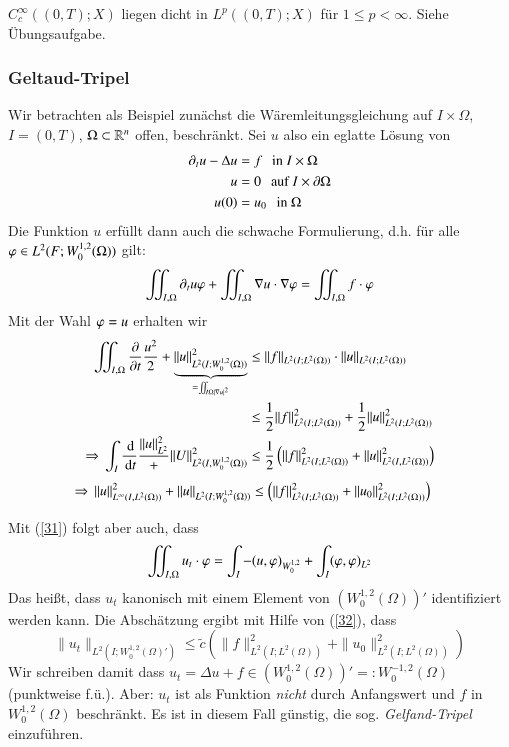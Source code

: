 \begin{remark}
    $C_c^\infty((0,T);X)$ liegen dicht in $L^p((0,T); X)$ für $1\leq p < \infty$. Siehe Übungsaufgabe.
\end{remark}

\subsubsection*{Geltaud-Tripel}
Wir betrachten als Beispiel zunächst die Wäremleitungsgleichung auf $I\times \Omega$, $I=(0,T)$,
$\Omega\subset \mathbb{R}^n$ offen, beschränkt. Sei $u$ also ein eglatte Lösung von
\begin{align*}
    \partial_t u - \Delta u &= f\hspace{.25cm} \text{in } I\times \Omega\\
    u&= 0 \hspace{.25cm} \text{auf } I\times \partial \Omega\\
    u(0)&=u_0 \hspace{.25cm} \text{in } \Omega
\end{align*}
Die Funktion $u$ erfüllt dann auch die schwache Formulierung, d.h. für alle $\varphi \in L^2(F; W_0^{1,2}
(\Omega))$ gilt:
\begin{align}\label{31}
    \iint_{I,\Omega} \partial_t u \varphi + \iint_{I,\Omega} \nabla u \cdot \nabla \varphi = \iint_{I,\Omega}
    f\cdot \varphi
\end{align}
Mit der Wahl $\varphi=u$ erhalten wir
\begin{align*}
    \iint_{I,\Omega} \frac{\partial}{\partial t}\frac{u^2}2 + \underbrace{\|u\|
    _{L^2(I;W_0^{1,2}(\Omega))}^2}_{=\iint_{I\Omega |\nabla u |^2}} &\leq \|f\|_{L^2(I;L^2(\Omega))}
    \cdot \|u\|_{L^2(I;L^2(\Omega))}\\
    &\leq \frac 12 \|f\|^2_{L^2(I;L^2(\Omega))} + \frac12 \|u\|^2_{L^2(I;L^2(\Omega))}\\
    \Rightarrow \, \int_I\frac{\, \mathrm{d}}{\, \mathrm{d} t} \frac{\|u\|_{L^2}^2} + \|U\|^2_{L^2(I,W_0^{1,2}(\Omega))}
    &\leq \frac 12 \left( \|f\|^2_{L^2(I;L^2(\Omega))} + \|u\|^2_{L^2(I,L^2(\Omega))}\right)
\end{align*}
\begin{align}\label{32}
    \Rightarrow \, \|u\|^2_{L^\infty(I,L^2(\Omega))}+\|u\|_{L^2(I;W_0^{1,2}(\Omega))} &\leq \left( \|f\|^2
    _{L^2(I;L^2(\Omega))} + \|u_0\|^2_{L^2(I;L^2(\Omega))} \right)
\end{align}

Mit (\ref{31}) folgt aber auch, dass
\[
    \iint_{I,\Omega} u_t\cdot \varphi = \int_I -(u,\varphi)_{W_0^{1,2}} + \int_I(\varphi,\varphi)_{L^2} 
\]
Das heißt, dass $u_t$ kanonisch mit einem Element von $(W_0^{1,2}(\Omega))'$ identifiziert werden kann.
Die Abschätzung ergibt mit Hilfe von (\ref{32}), dass
\[
    \|u_t\|_{L^2(I;W_0^{1,2}(\Omega)')} \leq \tilde c (\|f\|^2_{L^2(I;L^2(\Omega))} + \|u_0\|^2
    _{L^2(I;L^2(\Omega))}   )  
\]
Wir schreiben damit dass $u_t=\Delta u + f \in (W^{1,2}_0(\Omega))'=:W^{-1,2}_0(\Omega)$
(punktweise f.ü.). Aber: $u_t$ ist als Funktion \textit{nicht} durch Anfangswert und $f$ in
$W_0^{1,2}(\Omega)$ beschränkt.
Es ist in diesem Fall günstig, die sog. \textit{Gelfand-Tripel} einzuführen.

